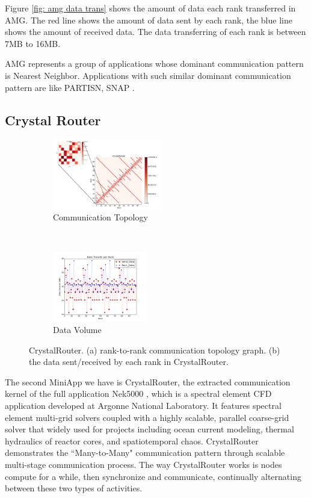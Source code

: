 \documentclass[conference]{IEEEtran}
\begin{document}
Figure \ref{fig: amg data trans} shows the amount of data each rank transferred in AMG. The red line shows the amount of data sent by each rank, the blue line shows the amount of received data. The data transferring of each rank is between 7MB to 16MB.

AMG represents a group of applications whose dominant communication pattern is Nearest Neighbor. Applications with such similar dominant communication pattern are like PARTISN, SNAP \cite{designforwardwebpage}.


\subsection{Crystal Router}
\label{sec:crystalrouter}

\begin{figure}[t!]
    \centering
    \begin{subfigure}[t]{0.22\textwidth}
        \centering
        \includegraphics[height=1.2in]{figs/appstudy/cr/cr_pip}
        \caption{Communication Topology}
        \label{fig: cr communication topology}
    \end{subfigure}
    ~
    \begin{subfigure}[t]{0.22\textwidth}
        \centering
        \includegraphics[height=1.2in]{figs/appstudy/cr/cr_data_transfer}
        \caption{Data Volume}
        \label{fig: cr data trans}
    \end{subfigure}
    \caption{CrystalRouter. (a) rank-to-rank communication topology graph. (b) the data sent/received by each rank in CrystalRouter. }
\end{figure}

The second MiniApp we have is CrystalRouter, the extracted communication kernel of the full application Nek5000 \cite{crystalrouter}, which is a spectral element CFD application developed at Argonne National Laboratory. It features spectral element multi-grid solvers coupled with a highly scalable, parallel coarse-grid solver that widely used for projects including ocean current modeling, thermal hydraulics of reactor cores, and spatiotemporal chaos. CrystalRouter demonstrates the ``Many-to-Many" communication pattern through scalable multi-stage communication process. The way CrystalRouter works is nodes compute for a while, then synchronize and communicate, continually alternating between these two types of activities.
\end{document}
